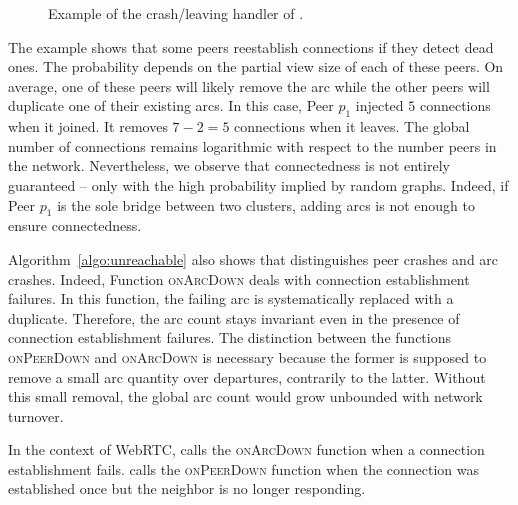 \begin{figure*}
  \centering
  \hspace{10pt}
  \hspace{10pt}
  \caption{\label{fig:crashexample}Example of the crash/leaving
    handler of \SPRAY. }
\end{figure*}

The example shows that some peers reestablish connections if they
detect dead ones. The probability depends on the partial view size of
each of these peers. On average, one of these peers will likely remove
the arc while the other peers will duplicate one of their existing
arcs. In this case, Peer $p_1$ injected $5$ connections when it
joined. It removes $7-2 =5 $ connections when it leaves. The global
number of connections remains logarithmic with respect to the number
peers in the network. Nevertheless, we observe that connectedness is
not entirely guaranteed -- only with the high probability implied by
random graphs. Indeed, if Peer $p_1$ is the sole bridge between two
clusters, adding arcs is not enough to ensure connectedness.

Algorithm~\ref{algo:unreachable} also shows that \SPRAY distinguishes peer
crashes and arc crashes. Indeed, Function \textsc{onArcDown} deals with
connection establishment failures. In this function, the failing arc is
systematically replaced with a duplicate. Therefore, the arc count stays
invariant even in the presence of connection establishment failures. The
distinction between the functions \textsc{onPeerDown} and \textsc{onArcDown} is
necessary because the former is supposed to remove a small arc quantity over
departures, contrarily to the latter. Without this small removal, the global arc
count would grow unbounded with network turnover.

In the context of WebRTC, \SPRAY calls the \textsc{onArcDown} function
when a connection establishment fails. \SPRAY calls the
\textsc{onPeerDown} function when the connection was established once
but the neighbor is no longer responding.

